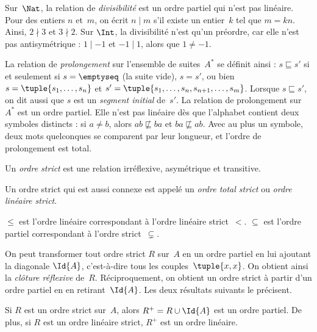 \documentclass[../../../include/open-logic-section]{subfiles}
\begin{document}
\begin{ex}
Sur~$\Nat$, la relation de \emph{divisibilité} est un ordre partiel
qui n’est pas linéaire. Pour des entiers $n$ et~$m$, on écrit
$n \mid m$ s’il existe un entier~$k$ tel que $m = kn$.
Ainsi, $2 \nmid 3$ et $3 \nmid 2$. Sur $\Int$, la divisibilité
n’est qu’un préordre, car elle n’est pas antisymétrique : $1 \mid -1$ et
$-1 \mid 1$, alors que $1 \neq -1$.
%
\end{ex}

\begin{ex}
La relation de \emph{prolongement} sur l’ensemble de suites~$A^*$ se
définit ainsi : $s \sqsubseteq s'$ si et seulement si $s = \emptyseq$
(la suite vide), $s = s'$, ou bien $s = \tuple{s_1, \dots, s_n}$ et
$s' = \tuple{s_1, \dots, s_n, s_{n+1}, \dots, s_m}$.
Lorsque $s \sqsubseteq s'$, on dit aussi que $s$ est un \emph{segment initial}
de~$s'$. La relation de prolongement sur $A^*$ est un ordre partiel.
Elle n’est pas linéaire dès que l’alphabet contient deux symboles distincts :
si $a \neq b$, alors $ab \not\sqsubseteq ba$ et $ba \not\sqsubseteq ab$.
Avec au plus un symbole, deux mots quelconques se comparent par leur
longueur, et l’ordre de prolongement est total.
%
%
\end{ex}

\begin{defn}
Un \emph{ordre strict} est une relation irréflexive, asymétrique et transitive.
\end{defn}

\begin{defn}
Un ordre strict qui est aussi connexe est appelé un \emph{ordre total strict}
ou \emph{ordre linéaire strict}.
\end{defn}

\begin{ex}
$\le$ est l’ordre linéaire correspondant à l’ordre linéaire strict~$<$.
$\subseteq$ est l’ordre partiel correspondant à l’ordre strict~$\subsetneq$.
\end{ex}

On peut transformer tout ordre strict $R$ sur~$A$ en un ordre partiel
en lui ajoutant la diagonale $\Id{A}$, c’est-à-dire tous les
couples~$\tuple{x, x}$. On obtient ainsi la \emph{clôture réflexive} de~$R$.
Réciproquement, on obtient un ordre strict à partir d’un ordre partiel
en en retirant~$\Id{A}$. Les deux résultats suivants le précisent.

\begin{prop}
Si $R$ est un ordre strict sur~$A$, alors $R^+ = R \cup \Id{A}$ est un
ordre partiel. De plus, si $R$ est un ordre linéaire strict, $R^+$ est
un ordre linéaire.
\end{prop}
\end{document}
